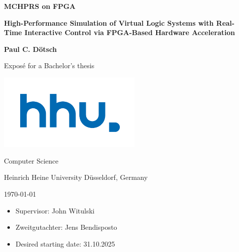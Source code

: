 \documentclass[a4paper,11pt]{article}
\begin{document}
\begin{center}
    \vspace*{1cm}

    {\Huge\bfseries MCHPRS on FPGA}

    \vspace{0.5cm}

    {\Large\bfseries High-Performance Simulation of Virtual Logic Systems with Real-Time Interactive Control via FPGA-Based Hardware Acceleration}

    \vspace{1.5cm}

    {\Large\bfseries Paul C. Dötsch}

    \vspace{1.5cm}

    {\Large Exposé for a Bachelor's thesis}

    \vspace{1.5cm}

    \includegraphics[width=7cm]{fig/hhu.pdf}

    \vspace{1.0cm}

    {\large
        Computer Science \par
        Heinrich Heine University Düsseldorf, Germany \par
        \today \par
    }

    \vspace{1cm}
\end{center}

\vspace{1.0cm}

\begin{itemize}[leftmargin=3cm, labelsep=0.5em, before=\large]
    \item Supervisor: John Witulski
    \item Zweitgutachter: Jens Bendisposto
    \item Desired starting date: 31.10.2025
\end{itemize}

\clearpage

\pagestyle{plain}
\end{document}
